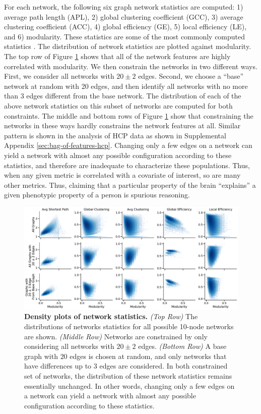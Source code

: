 For each network, the following six graph network statistics are computed: 1) average path length (APL), 2) global clustering coefficient (GCC), 3) average clustering coefficient (ACC), 4) global efficiency (GE), 5) local efficiency (LE), and 6) modularity. These statistics are some of the most commonly computed statistics \citep{sporns2005human,Bullmore2009-yj}. The distribution of network statistics are plotted against modularity. 
The top row of Figure \ref{fig:exp6} shows that all of the network features are highly correlated with modularity.
We then constrain the networks in two different ways. First, we consider all networks with $20 \pm 2$ edges. Second, we choose a ``base'' network at random with 20 edges, and then identify all networks with no more than 3 edges different from the  base network. The distribution of each of the above network statistics on this subset of networks are computed for both constraints. The middle and bottom rows of Figure \ref{fig:exp6} show that constraining the networks in these ways hardly constrains the network features at all. Similar pattern is shown in the analysis of HCP data as shown in Supplemental Appendix \ref{sec:bag-of-features-hcp}. Changing only a few edges on a network can yield a network with almost any possible configuration according to these statistics, and therefore are inadequate to characterize these populations. Thus, when any given metric is correlated with a covariate of interest, so are many other metrics. Thus, claiming that a particular property of the brain ``explains'' a given phenotypic property of a person is spurious reasoning.

\begin{figure} 
    \centering
    \includegraphics[width=\textwidth]{figures/dnd/density_num_edge_20_row}
    \caption{\textbf{Density plots of network statistics.} \textit{(Top Row)} The distributions of networks statistics for all possible 10-node networks are shown. \textit{(Middle Row)} Networks are constrained by only considering all networks with $20 \pm 2$ edges. \textit{(Bottom Row)} A base graph with $20$ edges is chosen at random, and only networks that have differences up to $3$ edges are considered. In both constrained set of networks, the distribution of these network statistics remains essentially unchanged. In other words, changing only a few edges on a network can yield a network with almost any possible configuration according to these statistics. }
    \label{fig:exp6}
\end{figure}

